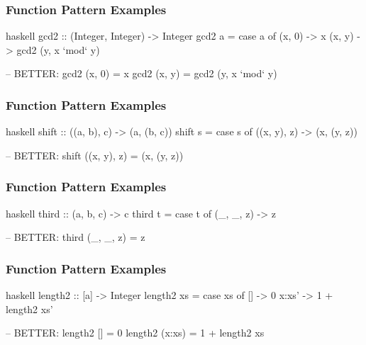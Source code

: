 \documentclass[dvipsnames]{beamer}
\theoremstyle{plain}
\begin{document}
\begin{frame}[fragile]
  \frametitle{Function Pattern Examples}

  \begin{exampleblock}{}
    \begin{pygments}{haskell}
gcd2 :: (Integer, Integer) -> Integer
gcd2 a =
    case a of
      (x, 0) -> x
      (x, y) -> gcd2 (y, x `mod` y)

-- BETTER:
gcd2 (x, 0) = x
gcd2 (x, y) = gcd2 (y, x `mod` y)
    \end{pygments}
  \end{exampleblock}
\end{frame}

\begin{frame}[fragile]
  \frametitle{Function Pattern Examples}

  \begin{exampleblock}{}
    \begin{pygments}{haskell}
shift :: ((a, b), c) -> (a, (b, c))
shift s =
    case s of
      ((x, y), z) -> (x, (y, z))

-- BETTER:
shift ((x, y), z) = (x, (y, z))
    \end{pygments}
  \end{exampleblock}
\end{frame}

\begin{frame}[fragile]
  \frametitle{Function Pattern Examples}

  \begin{exampleblock}{}
    \begin{pygments}{haskell}
third :: (a, b, c) -> c
third t =
    case t of
      (_, _, z) -> z

-- BETTER:
third (_, _, z) = z
    \end{pygments}
  \end{exampleblock}
\end{frame}

\begin{frame}[fragile]
  \frametitle{Function Pattern Examples}

  \begin{exampleblock}{}
    \begin{pygments}{haskell}
length2 :: [a] -> Integer
length2 xs =
    case xs of
      []    -> 0
      x:xs' -> 1 + length2 xs'

-- BETTER:
length2 []     = 0
length2 (x:xs) = 1 + length2 xs
    \end{pygments}
  \end{exampleblock}
\end{frame}
\end{document}
